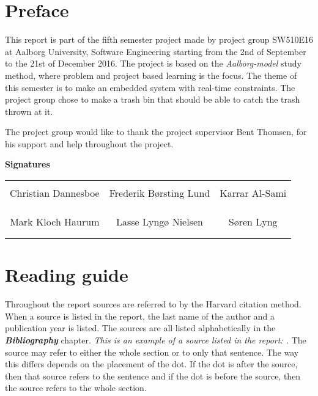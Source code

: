 \chapter*{Preface}
This report is part of the fifth semester project made by project group SW510E16 at Aalborg University, Software Engineering starting from the 2nd of September to the 21st of December 2016. \newline
The project is based on the \textit{Aalborg-model} study method, where problem and project based learning is the focus. The theme of this semester is to make an embedded system with real-time constraints. The project group chose to make a trash bin that should be able to catch the trash thrown at it. \newline

The project group would like to thank the project supervisor Bent Thomsen, for his  support and help throughout the project. 
\newline
\newline
\newline
\newline


{\Huge\textbf{Signatures}}
\newline
\newline


\begin{table}[H]
	\centering
	\begin{tabular}{c c c}
		\underline{\phantom{mmmmmmmmmmmmmm}} & \underline{\phantom{mmmmmmmmmmmmmm}} & \underline{\phantom{mmmmmmmmmmmmmm}} \\
		Christian Dannesboe			& Frederik Børsting Lund 		& Karrar Al-Sami 			\\
		&&\\
		&&\\
		\underline{\phantom{mmmmmmmmmmmmmm}} & \underline{\phantom{mmmmmmmmmmmmmm}} & \underline{\phantom{mmmmmmmmmmmmmm}} \\
		Mark Kloch Haurum			& Lasse Lyngø Nielsen 		& Søren Lyng 				\\
		&&\\
		&&\\
		
	\end{tabular}
\end{table}


\chapter*{Reading guide}
Throughout the report sources are referred to by the Harvard citation method. When a source is listed in the report, the last name of the author and a publication year is listed. The sources are all listed alphabetically in the \textit{\textbf{Bibliography}} chapter. \newline
\textit{This is an example of a source listed in the report: \textbf{\citep{safe}}.} \newline
The source may refer to either the whole section or to only that sentence. The way this differs depends on the placement of the dot. If the dot is after the source, then that source refers to the sentence and if the dot is before the source, then the source refers to the whole section. 

